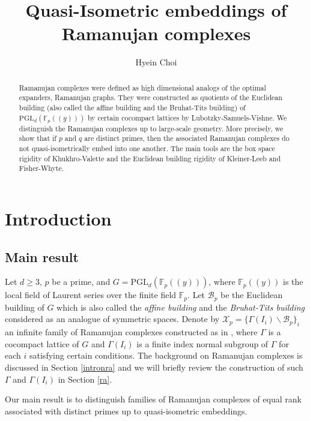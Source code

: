 \documentclass[letterpaper, reqno, 11pt]{amsart}
\title{Quasi-Isometric embeddings of Ramanujan complexes}
\author{Hyein Choi}
\theoremstyle{definition}
\theoremstyle{definition}
\theoremstyle{remark}
\newcommand{\Ga}{\Gamma}
\newcommand{\cal}{\mathcal}
\begin{document}
\begin{abstract}
Ramanujan complexes were defined as high dimensional analogs of the optimal expanders, Ramanujan graphs. They were constructed as quotients of the Euclidean building (also called the affine building and the Bruhat-Tits building) of $\mathrm{PGL}_d(\mathbb{F}_p((y)))$ by certain cocompact lattices 
by Lubotzky-Samuels-Vishne. We distinguish the Ramanujan complexes up to large-scale geometry. More precisely, we show that if $p$ and $q$ are distinct primes, then the associated Ramanujan complexes do not quasi-isometrically embed into one another. The main tools are the box space rigidity of Khukhro-Valette and the Euclidean building rigidity of Kleiner-Leeb and Fisher-Whyte.
\end{abstract}

\maketitle


\tableofcontents


\section{Introduction}



\subsection{Main result}

Let $d \geq 3$, $p$ be a prime, and $G=\mathrm{PGL}_d(\mathbb{F}_p((y)))$, where $\mathbb{F}_p((y))$ is the local field of Laurent series over the finite field $\mathbb{F}_p$. 
Let $\cal{B}_p$ be the Euclidean building of $G$ which is also called the \textit{affine building} and the \textit{Bruhat-Tits building} considered as an analogue of symmetric spaces.
Denote by $\mathscr{X}_p= \{ \Gamma(I_i)\backslash \mathcal{B}_p \}_i$ an infinite family of Ramanujan complexes constructed as in \cite{lubotzky2005explicit}, 
where $\Ga$ is a cocompact lattice of $G$ and $\Ga(I_i)$ is a finite index normal subgroup of $\Ga$ for each $i$ satisfying certain conditions.
The background on Ramanujan complexes is discussed in
Section \ref{intronra} and we will briefly review the construction of such $\Ga$ and $\Ga(I_i)$ in Section \ref{ra}.

Our main result is to distinguish families of Ramanujan complexes of equal rank associated with distinct primes up to quasi-isometric embeddings.
\end{document}
